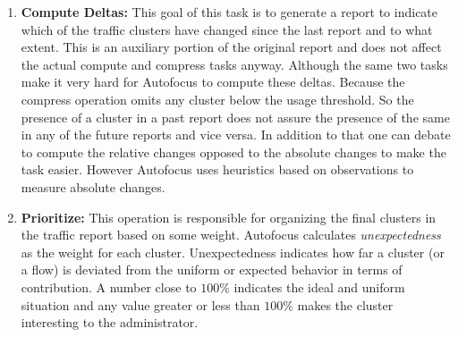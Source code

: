 \documentclass[twocolumn]{article}
\begin{document}
\begin{enumerate}
\item \textbf{Compute Deltas: } This goal of this task is to generate a report to indicate which of the traffic clusters have changed since the last report and to what extent. This is an auxiliary portion of the original report and does not affect the actual compute and compress tasks anyway. Although the same two tasks make it very hard for Autofocus to compute these deltas. Because the compress operation omits any cluster below the usage threshold. So the presence of a cluster in a past report does not assure the presence of the same in any of the future reports and vice versa. In addition to that one can debate to compute the relative changes opposed to the absolute changes to make the task easier. However Autofocus uses heuristics based on observations to measure absolute changes.  

\item \textbf{Prioritize: } This operation is responsible for organizing the final clusters in the traffic report based on some weight. Autofocus calculates \emph{unexpectedness} as the weight for each cluster. Unexpectedness indicates how far a cluster (or a flow) is deviated from the uniform or expected behavior in terms of contribution. A number close to $100\%$ indicates the ideal and uniform situation and  any value greater or less than $100\%$ makes the cluster interesting to the administrator. 

\end{enumerate}

		
\end{document}
